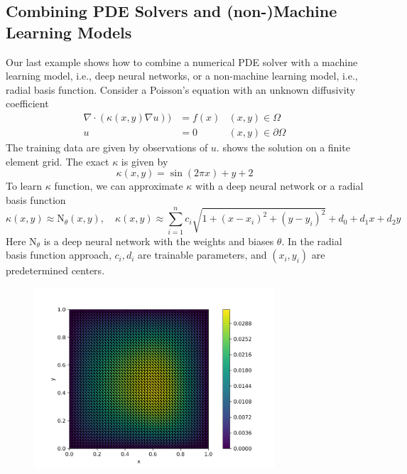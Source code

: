 \documentclass[3p,preprint,12pt]{elsarticle}
\begin{document}
\subsection{Combining PDE Solvers and (non-)Machine Learning Models}

Our last example shows how to combine a numerical PDE solver with a machine learning model, i.e., deep neural networks, or a non-machine learning model, i.e., radial basis function. Consider a Poisson's equation with an unknown diffusivity coefficient
\begin{equation}\label{equ:poisson}
\begin{aligned}
     \nabla \cdot (\kappa(x,y) \nabla u)) &= f(x) & (x,y)\in \Omega\\ 
     u &= 0 & (x,y)\in  \partial\Omega
\end{aligned}
\end{equation}
The training data are given by observations of $u$.  shows the solution on a finite element grid. The exact $\kappa$ is given by 
$$\kappa(x,y) = \sin(2\pi x) + y + 2$$
To learn $\kappa$ function, we can approximate $\kappa$ with a deep neural network or a radial basis function
$$\kappa(x,y) \approx \text{N}_\theta(x, y), \quad \kappa(x,y) \approx \sum_{i=1}^n c_i \sqrt{1+(x-x_i)^2 + (y-y_i)^2} + d_0 + d_1 x + d_2 y$$
Here $\text{N}_\theta$ is a deep neural network with the weights and biases $\theta$. In the radial basis function approach, $c_i, d_i$ are trainable parameters, and $(x_i, y_i)$ are predetermined centers.

\begin{figure}[htpb]
    \centering
    \includegraphics[width=0.8\textwidth]{paper/Kailai/figures/combine_forward.png}
    \caption{}
    \label{fig:cforward}
\end{figure}
\end{document}

